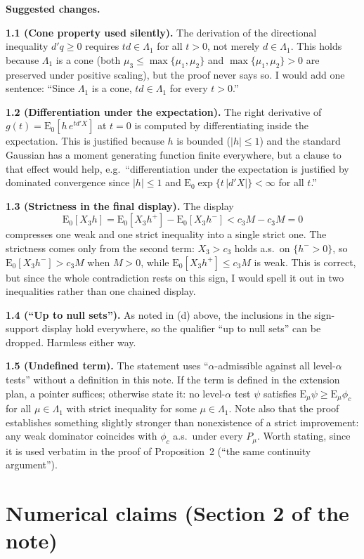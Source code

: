 \documentclass[12pt]{article}
\newcommand{\E}{\mathrm{E}}
\begin{document}
\textbf{Suggested changes.}

\textbf{1.1 (Cone property used silently).} The derivation of the
directional inequality $d'q\ge0$ requires $td\in\Lambda_1$ for all $t>0$,
not merely $d\in\Lambda_1$. This holds because $\Lambda_1$ is a cone
(both $\mu_3\le\max\{\mu_1,\mu_2\}$ and $\max\{\mu_1,\mu_2\}>0$ are
preserved under positive scaling), but the proof never says so. I would
add one sentence: ``Since $\Lambda_1$ is a cone, $td\in\Lambda_1$ for
every $t>0$.''

\textbf{1.2 (Differentiation under the expectation).} The right
derivative of $g(t)=\E_0[h\,e^{td'X}]$ at $t=0$ is computed by
differentiating inside the expectation. This is justified because $h$ is
bounded ($|h|\le1$) and the standard Gaussian has a moment generating
function finite everywhere, but a clause to that effect would help,
e.g.\ ``differentiation under the expectation is justified by dominated
convergence since $|h|\le1$ and $\E_0\exp\{t\,|d'X|\}<\infty$ for all
$t$.''

\textbf{1.3 (Strictness in the final display).} The display
\[
\E_0[X_3h]=\E_0[X_3h^+]-\E_0[X_3h^-]<c_3M-c_3M=0
\]
compresses one weak and one strict inequality into a single strict one.
The strictness comes only from the second term: $X_3>c_3$ holds a.s.\ on
$\{h^->0\}$, so $\E_0[X_3h^-]>c_3M$ when $M>0$, while
$\E_0[X_3h^+]\le c_3M$ is weak. This is correct, but since the whole
contradiction rests on this sign, I would spell it out in two
inequalities rather than one chained display.

\textbf{1.4 (``Up to null sets'').} As noted in (d) above, the
inclusions in the sign-support display hold everywhere, so the
qualifier ``up to null sets'' can be dropped. Harmless either way.

\textbf{1.5 (Undefined term).} The statement uses
``$\alpha$-admissible against all level-$\alpha$ tests'' without a
definition in this note. If the term is defined in the extension plan,
a pointer suffices; otherwise state it: no level-$\alpha$ test
$\psi$ satisfies $\E_\mu\psi\ge\E_\mu\phi_c$ for all
$\mu\in\Lambda_1$ with strict inequality for some $\mu\in\Lambda_1$.
Note also that the proof establishes something slightly stronger than
nonexistence of a strict improvement: any weak dominator coincides with
$\phi_c$ a.s.\ under every $P_\mu$. Worth stating, since it is used
verbatim in the proof of Proposition~2 (``the same continuity
argument'').

\section{Numerical claims (Section 2 of the note)}
\end{document}
